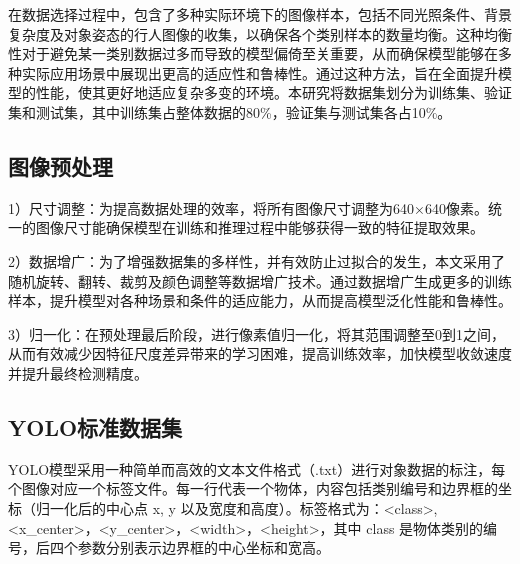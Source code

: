 \documentclass[journal]{IEEEtran}
\numberwithin{figure}{section}%
\begin{document}
在数据选择过程中，包含了多种实际环境下的图像样本，包括不同光照条件、背景复杂度及对象姿态的行人图像的收集，以确保各个类别样本的数量均衡。这种均衡性对于避免某一类别数据过多而导致的模型偏倚至关重要，从而确保模型能够在多种实际应用场景中展现出更高的适应性和鲁棒性。通过这种方法，旨在全面提升模型的性能，使其更好地适应复杂多变的环境。本研究将数据集划分为训练集、验证集和测试集，其中训练集占整体数据的80\%，验证集与测试集各占10\%。
\subsection{图像预处理}
1）尺寸调整：为提高数据处理的效率，将所有图像尺寸调整为640×640像素。统一的图像尺寸能确保模型在训练和推理过程中能够获得一致的特征提取效果。\par
2）数据增广：为了增强数据集的多样性，并有效防止过拟合的发生，本文采用了随机旋转、翻转、裁剪及颜色调整等数据增广技术。通过数据增广生成更多的训练样本，提升模型对各种场景和条件的适应能力，从而提高模型泛化性能和鲁棒性。\par
3）归一化：在预处理最后阶段，进行像素值归一化，将其范围调整至0到1之间，从而有效减少因特征尺度差异带来的学习困难，提高训练效率，加快模型收敛速度并提升最终检测精度。
\subsection{YOLO标准数据集}
YOLO模型采用一种简单而高效的文本文件格式（.txt）进行对象数据的标注，每个图像对应一个标签文件。每一行代表一个物体，内容包括类别编号和边界框的坐标（归一化后的中心点 x, y 以及宽度和高度）。标签格式为：\textless class\textgreater, \textless x\_center\textgreater，\textless y\_center\textgreater，\textless width\textgreater，\textless height\textgreater，其中 class 是物体类别的编号，后四个参数分别表示边界框的中心坐标和宽高。
\end{document}
